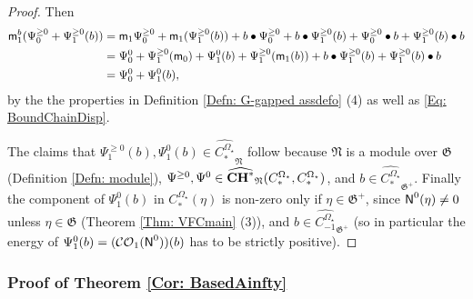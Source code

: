 \documentclass[10pt]{amsart}
\numberwithin{equation}{section}
\theoremstyle{plain}
\theoremstyle{definition}
\theoremstyle{remark}
\numberwithin{equation}{section}
\newcommand{\wh}[1]{\widehat{#1}}
\newcommand{\mf}[1]{\mathfrak{#1}}
\newcommand{\CO}{\mathcal{CO}}
\newcommand{\CC}{\textbf{\textup{CH}}}
\newcommand{\CBa}{C_*^{\Omega_\star}}
\newcommand{\Cba}[1]{C_{#1}^{\Omega_\star}}
\newcommand{\mm}{\textup{\textsf{m}}}
\newcommand{\NN}{\textup{\textsf{N}}}
\begin{document}
{\begin{proof}
Then 
\begin{align*}
	\mm_1^b(\Psi_0^{\geq 0} + \Psi_1^{\geq 0}(b)) &= \mm_1\Psi_0^{\geq 0} + \mm_1(\Psi_1^{\geq 0}(b)) + b\bullet \Psi_0^{\geq 0} + b\bullet \Psi_1^{\geq 0}(b) + \Psi_0^{\geq 0}\bullet b + \Psi_1^{\geq 0}(b)\bullet b\\
	&= \Psi_0^{0}+\Psi_1^{\geq 0}(\mm_0) + \Psi_1^{0}(b) + \Psi_1^{\geq 0}(\mm_1(b))+ b \bullet \Psi_1^{\geq 0}(b) + \Psi_1^{\geq 0}(b)\bullet b\\
	&= \Psi_0^{0} + \Psi_1^{0}(b),
\end{align*}
by the the properties in Definition \ref{Defn: G-gapped assdefo} (4) as well as \eqref{Eq: BoundChainDisp}.

The claims that $\Psi_1^{\geq 0}(b), \Psi_1^{0}(b) \in \wh{\CBa}_\mf{N}$ follow because $\mf{N}$ is a module over $\mf{G}$ (Definition \ref{Defn: module}), $\Psi^{\geq 0}, \Psi^{0}\in \wh{\CC^*}_{\mf{N}}(\CBa,\CBa)$, and $b\in \wh{\CBa}_{\mf{G}^+}$.
Finally the component of $\Psi_1^{0}(b)$ in $\CBa(\eta)$  is non-zero only if $\eta\in \mf{G}^+$, since $\NN^{0}(\eta) \neq 0$ unless $\eta \in \mf{G}$ (Theorem \ref{Thm: VFCmain} (3)), and $b \in \wh{\Cba{-1}}_{\mf{G}^+}$ (so in particular the energy of $\Psi_1^{0}(b)=(\CO_1(\NN^{0}))(b)$ has to be strictly positive).
\end{proof}





\subsubsection{Proof of Theorem \texorpdfstring{\ref{Cor: BasedAinfty}}{4.12}}

}
\end{document}
